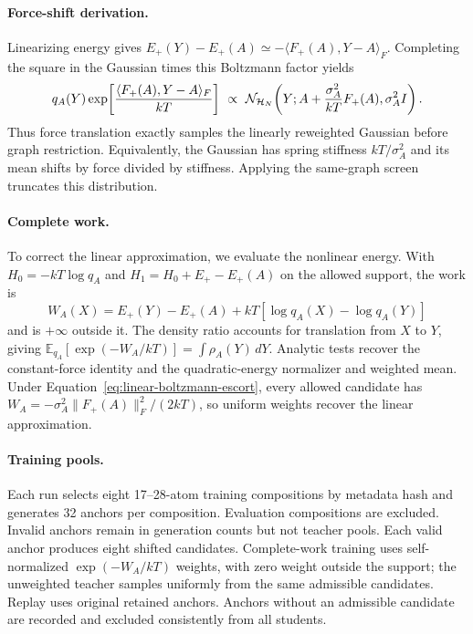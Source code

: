 \paragraph{Force-shift derivation.}
Linearizing energy gives $E_+(Y)-E_+(A)\simeq-\langle F_+(A),Y-A\rangle_F$. Completing the square in the Gaussian times this Boltzmann factor yields
\begin{equation}
 q_A(Y)\exp\!\left[\frac{\langle F_+(A),Y-A\rangle_F}{kT}\right]
 \ \propto\
 \mathcal N_{\mathcal H_N}\!\left(Y;A+\frac{\sigma_A^2}{kT}F_+(A),\sigma_A^2I\right).
 \label{eq:linear-boltzmann-escort}
\end{equation}
Thus force translation exactly samples the linearly reweighted Gaussian before graph restriction. Equivalently, the Gaussian has spring stiffness $kT/\sigma_A^2$ and its mean shifts by force divided by stiffness. Applying the same-graph screen truncates this distribution.

\paragraph{Complete work.}
To correct the linear approximation, we evaluate the nonlinear energy. With $H_0=-kT\log q_A$ and $H_1=H_0+E_+-E_+(A)$ on the allowed support, the work is
\begin{equation}
 W_A(X)=E_+(Y)-E_+(A)+kT[\log q_A(X)-\log q_A(Y)]
\end{equation}
and is $+\infty$ outside it. The density ratio accounts for translation from $X$ to $Y$, giving $\mathbb E_{q_A}[\exp(-W_A/kT)]=\int\rho_A(Y)\,dY$. Analytic tests recover the constant-force identity and the quadratic-energy normalizer and weighted mean. Under Equation~\eqref{eq:linear-boltzmann-escort}, every allowed candidate has $W_A=-\sigma_A^2\|F_+(A)\|_F^2/(2kT)$, so uniform weights recover the linear approximation.

\paragraph{Training pools.}
Each run selects eight 17--28-atom training compositions by metadata hash and generates 32 anchors per composition. Evaluation compositions are excluded. Invalid anchors remain in generation counts but not teacher pools. Each valid anchor produces eight shifted candidates. Complete-work training uses self-normalized $\exp(-W_A/kT)$ weights, with zero weight outside the support; the unweighted teacher samples uniformly from the same admissible candidates. Replay uses original retained anchors. Anchors without an admissible candidate are recorded and excluded consistently from all students.

